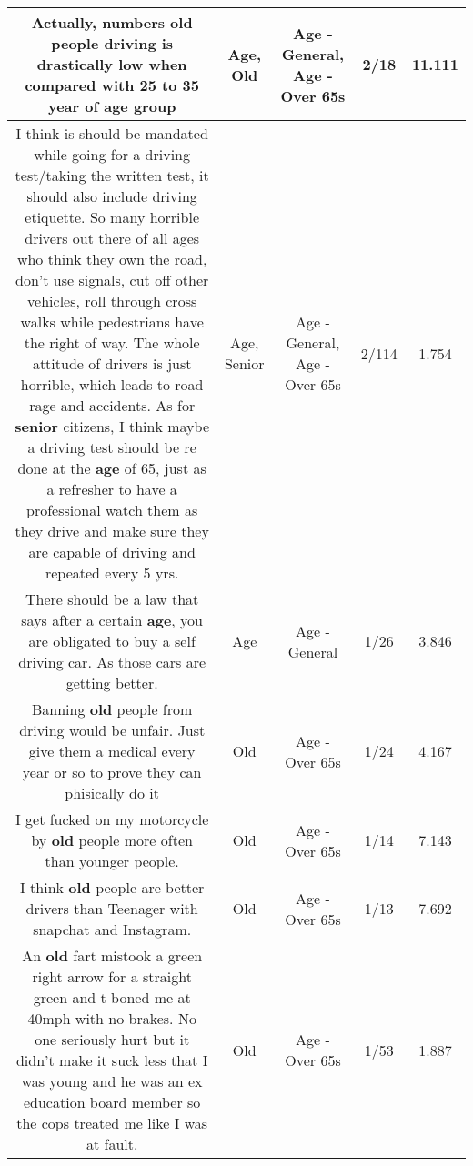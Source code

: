 \documentclass[11pt]{article}
\newlength\mylength
\begin{document}
\begin{center}
\begin{longtable}{|C{.65\mylength}|C{.30\mylength}|C{.12\mylength}|C{.12\mylength}|C{.12\mylength}|}
  \small Actually, numbers \textbf{old} people driving is drastically low when compared with 25 to 35 year of \textbf{age} group\normalsize   & Age, Old & Age - General, Age - Over 65s & 2/18 & 11.111 \\  \hline
  \small I think is should be mandated while going for a driving test/taking the written test, it should also include driving etiquette. So many horrible drivers out there of all ages who think they own the road, don't use signals, cut off other vehicles, roll through cross walks while pedestrians have the right of way. The whole attitude of drivers is just horrible, which leads to road rage and accidents. As for \textbf{senior} citizens, I think maybe a driving test should be re done at the \textbf{age} of 65, just as a refresher to have a professional watch them as they drive and make sure they are capable of driving and repeated every 5 yrs.\normalsize   & Age, Senior & Age - General, Age - Over 65s & 2/114 & 1.754 \\  \hline
  \small There should be a law that says after a certain \textbf{age}, you are obligated to buy a self driving car. As those cars are getting better.\normalsize   & Age & Age - General & 1/26 & 3.846 \\  \hline
  \small Banning \textbf{old} people from driving would be unfair. Just give them a medical every year or so to prove they can phisically do it\normalsize   & Old & Age - Over 65s & 1/24 & 4.167 \\  \hline
  \small I get fucked on my motorcycle by \textbf{old} people more often than younger people.\normalsize   & Old & Age - Over 65s & 1/14 & 7.143 \\  \hline
  \small I think \textbf{old} people are better drivers than Teenager with snapchat and Instagram.\normalsize   & Old & Age - Over 65s & 1/13 & 7.692 \\  \hline
  \small An \textbf{old} fart mistook a green right arrow for a straight green and t-boned me at 40mph with no brakes. No one seriously hurt but it didn't make it suck less that I was young and he was an ex education board member so the cops treated me like I was at fault.\normalsize   & Old & Age - Over 65s & 1/53 & 1.887 \\  \hline

\end{longtable}
\end{center}
\end{document}
